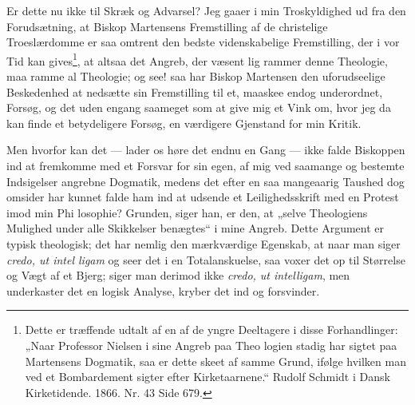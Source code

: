 \documentclass[12pt]{book}
\newcommand{\opage}[1]{\marginnote{\footnotesize\textit{[#1]}}}
\begin{document}
Er dette nu ikke til Skræk og Advarsel? Jeg gaaer
i min Troskyldighed ud fra den Forudsætning, at Biskop
Martensens Fremstilling af de christelige Troeslærdomme
er saa omtrent den bedste videnskabelige Fremstilling, der
i vor Tid kan gives\footnote{Dette er træffende udtalt af en af de yngre Deeltagere i disse
Forhandlinger: „Naar Professor Nielsen i sine Angreb paa Theo\-%
logien stadig har sigtet paa Martensens Dogmatik, saa er dette skeet
af samme Grund, ifølge hvilken man ved et Bombardement sigter
efter Kirketaarnene.“ Rudolf Schmidt i Dansk Kirketidende. 1866.
Nr. 43 Side 679.}, at altsaa det Angreb, der væsent\-%
lig rammer denne Theologie, maa ramme al Theologie; og
see! saa har Biskop Martensen den uforudseelige Beskedenhed
at nedsætte sin Fremstilling til et, maaskee endog underordnet,
Forsøg, og det uden engang saameget som at give mig et
Vink om, hvor jeg da kan finde et betydeligere Forsøg, en
værdigere Gjenstand for min Kritik.

\opage{78}\setcounter{footnote}{0}%
Men hvorfor kan det --- lader os høre det endnu en
Gang --- ikke falde Biskoppen ind at fremkomme med et
Forsvar for sin egen, af mig ved saamange og bestemte
Indsigelser angrebne Dogmatik, medens det efter en saa
mangeaarig Taushed dog omsider har kunnet falde ham ind
at udsende et Leilighedsskrift med en Protest imod min Phi\-%
losophie? Grunden, siger han, er den, at „selve Theologiens
Mulighed under alle Skikkelser benægtes“ i mine Angreb.
Dette Argument er typisk theologisk; det har nemlig den
mærkværdige Egenskab, at naar man siger \textit{credo, ut intel\-%
ligam} og seer det i en Totalanskuelse, saa voxer det op til
Størrelse og Vægt af et Bjerg; siger man derimod ikke \textit{credo,
ut intelligam}, men underkaster det en logisk Analyse, kryber
det ind og forsvinder.
\end{document}
